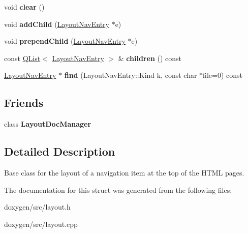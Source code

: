 \begin{DoxyCompactItemize}
\item 
\mbox{\label{struct_layout_nav_entry_ac705591582b67407e51fbb366eab2c4d}} 
void {\bfseries clear} ()
\item 
\mbox{\label{struct_layout_nav_entry_a17dc5d09c4df07c0d49275ed2d95e789}} 
void {\bfseries add\+Child} (\mbox{\hyperlink{struct_layout_nav_entry}{Layout\+Nav\+Entry}} $\ast$e)
\item 
\mbox{\label{struct_layout_nav_entry_a39a0c214375c9766d91d79ef80365ab6}} 
void {\bfseries prepend\+Child} (\mbox{\hyperlink{struct_layout_nav_entry}{Layout\+Nav\+Entry}} $\ast$e)
\item 
\mbox{\label{struct_layout_nav_entry_a7a89a17fe61ef8b1269d5bfccea38868}} 
const \mbox{\hyperlink{class_q_list}{Q\+List}}$<$ \mbox{\hyperlink{struct_layout_nav_entry}{Layout\+Nav\+Entry}} $>$ \& {\bfseries children} () const
\item 
\mbox{\label{struct_layout_nav_entry_ae2f5ea2dca923decb8500f78760b34f3}} 
\mbox{\hyperlink{struct_layout_nav_entry}{Layout\+Nav\+Entry}} $\ast$ {\bfseries find} (Layout\+Nav\+Entry\+::\+Kind k, const char $\ast$file=0) const
\end{DoxyCompactItemize}
\subsection*{Friends}
\begin{DoxyCompactItemize}
\item 
\mbox{\label{struct_layout_nav_entry_af6431c54f9737e0168be5926d2d9b5e9}} 
class {\bfseries Layout\+Doc\+Manager}
\end{DoxyCompactItemize}


\subsection{Detailed Description}
Base class for the layout of a navigation item at the top of the H\+T\+ML pages. 

The documentation for this struct was generated from the following files\+:\begin{DoxyCompactItemize}
\item 
doxygen/src/layout.\+h\item 
doxygen/src/layout.\+cpp\end{DoxyCompactItemize}
